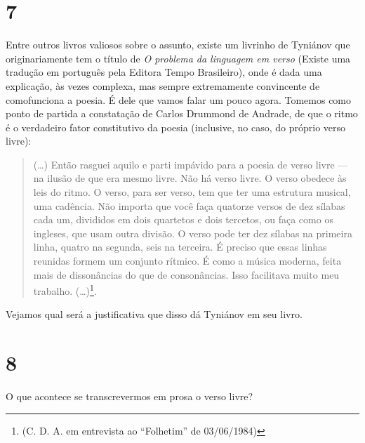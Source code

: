 \section{7}


Entre outros livros valiosos sobre o assunto, existe um livrinho de
Tyniánov que originariamente tem o título de \emph{O problema da
linguagem em verso} (Existe uma tradução em
português pela Editora Tempo Brasileiro), onde é dada uma explicação, às
vezes complexa, mas sempre extremamente convincente de comofunciona a
poesia. É dele que vamos falar um pouco agora. Tomemos como ponto de
partida a constatação de Carlos Drummond de Andrade, de que o ritmo é o
verdadeiro fator constitutivo da poesia (inclusive, no caso, do próprio
verso livre):

\begin{quote} 
(\ldots{}) Então rasguei aquilo e parti impávido para a poesia
de verso livre --- na ilusão de que era mesmo livre. Não há verso livre.
O verso obedece às leis do ritmo. O verso, para ser verso, tem que ter
uma estrutura musical, uma cadência. Não importa que você faça quatorze
versos de dez sílabas cada um, divididos em dois quartetos e dois
tercetos, ou faça como os ingleses, que usam outra divisão. O verso pode
ter dez sílabas na primeira linha, quatro na segunda, seis na terceira.
É preciso que essas linhas reunidas formem um conjunto rítmico. É como a
música moderna, feita mais de dissonâncias do que de consonâncias. Isso
facilitava muito meu trabalho. (\ldots{})\footnote{(C. D. A. em entrevista ao
``Folhetim'' de 03/06/1984)}.
\end{quote}

Vejamos qual será a justificativa que disso dá Tyniánov em seu livro.

\section{8}

O que acontece se transcrevermos em prosa o verso livre?

